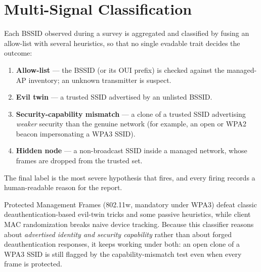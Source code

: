 \section{Multi-Signal Classification}
Each BSSID observed during a survey is aggregated and classified by fusing an
allow-list with several heuristics, so that no single evadable trait decides the
outcome:
\begin{enumerate}
  \item \textbf{Allow-list} --- the BSSID (or its OUI prefix) is checked against
        the managed-AP inventory; an unknown transmitter is suspect.
  \item \textbf{Evil twin} --- a trusted SSID advertised by an unlisted BSSID.
  \item \textbf{Security-capability mismatch} --- a clone of a trusted SSID
        advertising \emph{weaker} security than the genuine network (for example,
        an open or WPA2 beacon impersonating a WPA3 SSID).
  \item \textbf{Hidden node} --- a non-broadcast SSID inside a managed network,
        whose frames are dropped from the trusted set.
\end{enumerate}
The final label is the most severe hypothesis that fires, and every firing records
a human-readable reason for the report.

\begin{highlight}
Protected Management Frames (802.11w, mandatory under WPA3) defeat classic
deauthentication-based evil-twin tricks and some passive heuristics, while client
MAC randomization breaks naive device tracking. Because this classifier reasons
about \emph{advertised identity and security capability} rather than about
forged deauthentication responses, it keeps working under both: an open clone of
a WPA3 SSID is still flagged by the capability-mismatch test even when every
frame is protected.
\end{highlight}

